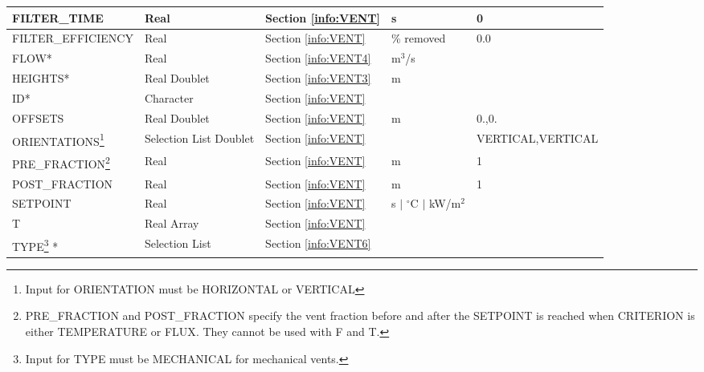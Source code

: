 \begin{minipage}{6.5in}
\begin{longtable}{@{\extracolsep{\fill}}|l|l|l|l|l|}
{\ct FILTER\_TIME}    					 & Real  		  & Section \ref{info:VENT}      & s                            &  0               \\ \hline
{\ct FILTER\_EFFICIENCY}    					 & Real  		  & Section \ref{info:VENT}      & \% removed                            &  0.0               \\ \hline
{\ct FLOW}*      	 					 & Real  		  & Section \ref{info:VENT4}     & m$^3$/s                     &                 \\ \hline
{\ct HEIGHTS}*      					 & Real Doublet  	  & Section \ref{info:VENT3}     & m                           &                 \\ \hline
{\ct ID}*                                                         & Character  	          & Section \ref{info:VENT}      &                             &                 \\ \hline
{\ct OFFSETS}       					 & Real Doublet 		  & Section \ref{info:VENT}      & m                           &      0.,0.        \\ \hline
{\ct ORIENTATIONS}\footnote{Input for {\ct ORIENTATION} must be {\ct HORIZONTAL} or {\ct VERTICAL}}  					 & Selection List Doublet 		  & Section \ref{info:VENT}      &                             & {\tiny VERTICAL,VERTICAL}                \\ \hline
{\ct PRE\_FRACTION}\footnote{{\ct PRE\_FRACTION} and {\ct POST\_FRACTION} specify the vent fraction before and after the {\ct SETPOINT} is reached when {\ct CRITERION} is either {\ct TEMPERATURE} or {\ct FLUX}. They cannot be used with {\ct F} and {\ct T}.}       					 & Real 		  & Section \ref{info:VENT}      & m                           &      1        \\ \hline
{\ct POST\_FRACTION}       					 & Real 		  & Section \ref{info:VENT}      & m                           &      1        \\ \hline
{\ct SETPOINT}           					 & Real  	          & Section \ref{info:VENT}      & s $\mid$ $^\circ$C $\mid$ kW/m$^2$ &                 \\ \hline
{\ct T}  					 & Real Array  		  & Section \ref{info:VENT}      &                             &                 \\ \hline
{\ct TYPE}\footnote{Input for {\ct TYPE} must be {\ct MECHANICAL} for mechanical vents.} *
                                                                 & Selection List         & Section \ref{info:VENT6}     &                             &                 \\ \hline
\end{longtable}
\end{minipage}

